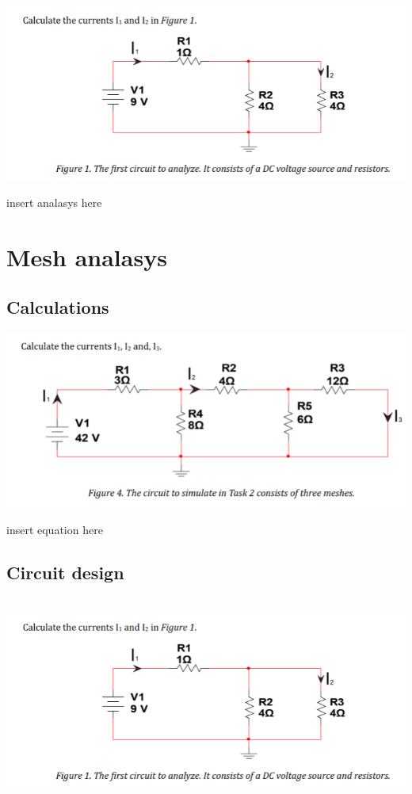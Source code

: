 \documentclass[11pt]{article}
\begin{document}
\noindent
\\
\includegraphics[width=\linewidth]{1.1 calculation.png}

insert analasys here




\section{\bf{Mesh analasys}}

\subsection[25pt]{\bf{Calculations}}

\includegraphics[width=\linewidth]{2.1 calculations.png}


\noindent
insert equation here

\subsection[25pt]{\bf{Circuit design}}

\noindent
\\
\includegraphics[width=\linewidth]{1.1 calculation.png}
\end{document}
